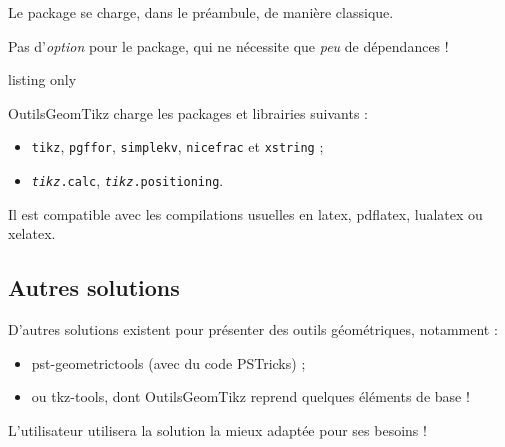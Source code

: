\documentclass[french,a4paper,11pt]{article}
\providecommand\PSTricks{\textsf{PSTricks}\xspace}
\begin{document}
\begin{importantblock}
Le package se charge, dans le préambule, de manière classique.

Pas d'\textit{option} pour le package, qui ne nécessite que \textit{peu} de dépendances !
\end{importantblock}

\begin{PresentationCode}{listing only}
\usepackage{OutilsGeomTikz}
\end{PresentationCode}

\begin{noteblock}
\textsf{OutilsGeomTikz} charge les packages et librairies suivants :

\begin{itemize}
	\item \texttt{tikz}, \texttt{pgffor}, \texttt{simplekv}, \texttt{nicefrac} et \texttt{xstring} ;
	\item \texttt{\textit{tikz}.calc}, \texttt{\textit{tikz}.positioning}.
\end{itemize}

Il est compatible avec les compilations usuelles en \textsf{latex}, \textsf{pdflatex}, \textsf{lualatex} ou \textsf{xelatex}.
\end{noteblock}

\subsection{Autres solutions}

\begin{noteblock}
D'autres solutions existent pour présenter des outils géométriques, notamment :

\begin{itemize}
	\item \textsf{pst-geometrictools}\footnotemark{} (avec du code \PSTricks) ;
	\item ou \textsf{tkz-tools}\footnotemark{}, dont \textsf{OutilsGeomTikz} reprend quelques éléments de base  !
\end{itemize}

L'utilisateur utilisera la solution la mieux adaptée pour ses besoins !
\end{noteblock}

\pagebreak
\end{document}
